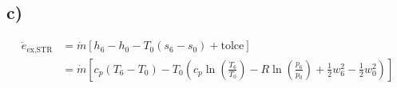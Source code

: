 

\subsection*{c)}

\begin{align*}
\dot{e}_{\text{ex,STR}} &= \dot{m} \left[ h_{6} - h_{0} - T_{0} \left( s_{6} - s_{0} \right) + \text{tolce} \right] \\
&= \dot{m} \left[ c_{p} \left( T_{6} - T_{0} \right) - T_{0} \left( c_{p} \ln \left( \frac{T_{6}}{T_{0}} \right) - R \ln \left( \frac{p_{6}}{p_{0}} \right) + \frac{1}{2} w_{6}^{2} - \frac{1}{2} w_{0}^{2} \right) \right]
\end{align*}
